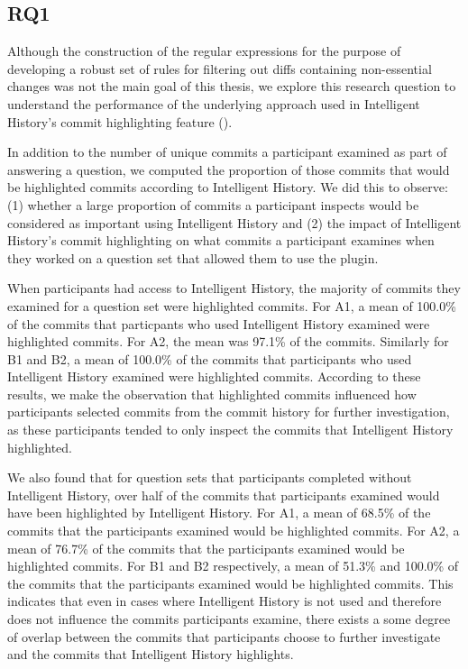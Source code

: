 
\subsection{RQ1}
\label{subsec:RQ1}


Although the construction of the regular expressions for the purpose of developing a robust set of rules for filtering out diffs containing non-essential changes 
was not the main goal of this thesis,
we explore this research question to understand the performance of the underlying approach used in Intelligent History's commit highlighting feature ().

In addition to the number of unique commits a participant examined as part of answering a question,
we computed the proportion of those commits that would be highlighted commits according to Intelligent History.
We did this to observe:
(1) whether a large proportion of commits a participant inspects would be considered as important using Intelligent History
and (2) the impact of Intelligent History's commit highlighting on what commits a participant examines when 
they worked on a question set that allowed them to use the plugin.

When participants had access to Intelligent History,
the majority of commits they examined for a question set were highlighted commits.
For A1, a mean of 100.0\% of the commits that particpants who used Intelligent History examined were highlighted commits.
For A2, the mean was 97.1\% of the commits.
Similarly for B1 and B2, a mean of 100.0\% of the commits that participants who used Intelligent History examined were highlighted commits.
According to these results, we make the observation that highlighted commits influenced how participants selected commits from the commit history for further investigation, as
these participants tended to only inspect the commits that Intelligent History highlighted. 

We also found that for question sets that participants completed without Intelligent History,
over half of the commits that participants examined would have been highlighted by Intelligent History.
For A1, a mean of 68.5\% of the commits that the participants examined would be highlighted commits.
For A2, a mean of 76.7\% of the commits that the participants examined would be highlighted commits.
For B1 and B2 respectively, a mean of 51.3\% and 100.0\% of the commits that the participants examined would be highlighted commits.
This indicates that even in cases where Intelligent History is not used and therefore does not influence the commits participants examine,
there exists a some degree of overlap between the commits that participants choose to further investigate and the commits that Intelligent History highlights.

